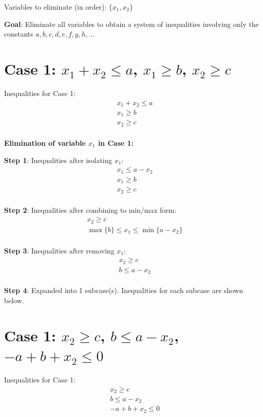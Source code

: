 \documentclass{article}
\begin{document}
Variables to eliminate (in order): $\{x_{1}, x_{2}\}$

\textbf{Goal}: Eliminate all variables to obtain a system of inequalities
involving only the constants $a, b, c, d, e, f, g, h, \ldots$

\section{Case 1: $x_{1} + x_{2} \leq a$, $x_{1} \geq b$, $x_{2} \geq c$}

Inequalities for Case 1:
\begin{align}
& x_{1} + x_{2} \leq a \\
& x_{1} \geq b \\
& x_{2} \geq c \\
\end{align}

\textbf{Elimination of variable $x_{1}$ in Case 1:}

\textbf{Step 1}: Inequalities after isolating $x_{1}$:
\begin{align}
& x_{1} \leq a - x_{2} \\
& x_{1} \geq b \\
& x_{2} \geq c \\
\end{align}

\textbf{Step 2}: Inequalities after combining to min/max form:
\begin{align}
& x_{2} \geq c \\
& \max\{b\} \leq x_{1} \leq \min\{a - x_{2}\} \\
\end{align}

\textbf{Step 3}: Inequalities after removing $x_{1}$:
\begin{align}
& x_{2} \geq c \\
& b \leq a - x_{2} \\
\end{align}

\textbf{Step 4}: Expanded into 1 subcase(s). Inequalities for each subcase are shown below.

\section{Case 1: $x_{2} \geq c$, $b \leq a - x_{2}$, $- a + b + x_{2} \leq 0$}

Inequalities for Case 1:
\begin{align}
& x_{2} \geq c \\
& b \leq a - x_{2} \\
& - a + b + x_{2} \leq 0 \\
\end{align}
\end{document}
